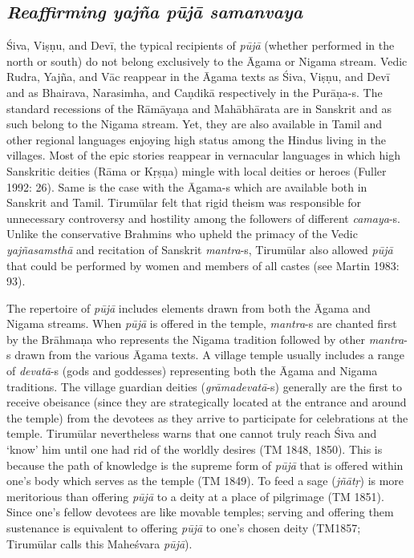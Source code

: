 \subsection*{\textit{Reaffirming yajña pūjā samanvaya}}

Śiva, Viṣṇu, and Devī, the typical recipients of \textit{pūjā} (whether performed in the north or south) do not belong exclusively to the Āgama or Nigama stream. Vedic Rudra, Yajña, and Vāc reappear in the Āgama texts as Śiva, Viṣṇu, and Devī and as Bhairava, Narasimha, and Caṇdikā respectively in the Purāṇa-s. The standard recessions of the Rāmāyaṇa and Mahābhārata are in Sanskrit and as such belong to the Nigama stream. Yet, they are also available in Tamil and other regional languages enjoying high status among the Hindus living in the villages. Most of the epic stories reappear in vernacular languages in which high Sanskritic deities (Rāma or Kṛṣṇa) mingle with local deities or heroes (Fuller 1992: 26). Same is the case with the Āgama-s which are available both in Sanskrit and Tamil. Tirumūlar felt that rigid theism was responsible for unnecessary controversy and hostility among the followers of different \textit{camaya}-s. Unlike the conservative Brahmins who upheld the primacy of the Vedic \textit{yajñasamsthā} and recitation of Sanskrit \textit{mantra}-s, Tirumūlar also allowed \textit{pūjā} that could be performed by women and members of all castes (see Martin 1983: 93).

The repertoire of \textit{pūjā} includes elements drawn from both the Āgama and Nigama streams. When \textit{pūjā} is offered in the temple, \textit{mantra}-s are chanted first by the Brāhmaṇa who represents the Nigama tradition followed by other \textit{mantra}-s drawn from the various Āgama texts. A village temple usually includes a range of \textit{devatā}-s (gods and goddesses) representing both the Āgama and Nigama traditions. The village guardian deities (\textit{grāmadevatā}-s) generally are the first to receive obeisance (since they are strategically located at the entrance and around the temple) from the devotees as they arrive to participate for celebrations at the temple. Tirumūlar nevertheless warns that one cannot truly reach Śiva and ‘know’ him until one had rid of the worldly desires (TM 1848, 1850). This is because the path of knowledge is the supreme form of \textit{pūjā} that is offered within one’s body which serves as the temple (TM 1849). To feed a sage (\textit{jñātṛ}) is more meritorious than offering \textit{pūjā} to a deity at a place of pilgrimage (TM 1851). Since one’s fellow devotees are like movable temples; serving and offering them sustenance is equivalent to offering \textit{pūjā} to one’s chosen deity (TM1857; Tirumūlar calls this Maheśvara\textit{ pūjā}).

